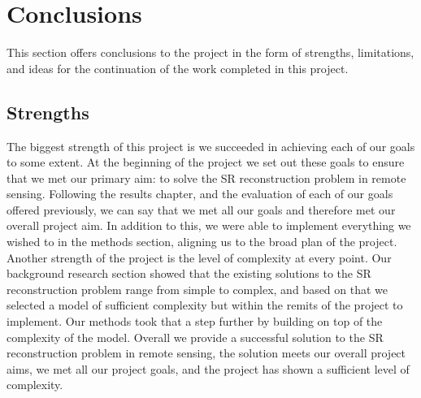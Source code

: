 \section{Conclusions}
This section offers conclusions to the project in the form of strengths, limitations, and ideas for the continuation of the work completed in this project.

\subsection{Strengths}
The biggest strength of this project is we succeeded in achieving each of our goals to some extent. At the beginning of the project we set out these goals to ensure that we met our primary aim: to solve the SR reconstruction problem in remote sensing. Following the results chapter, and the evaluation of each of our goals offered previously, we can say that we met all our goals and therefore met our overall project aim. In addition to this, we were able to implement everything we wished to in the methods section, aligning us to the broad plan of the project. Another strength of the project is the level of complexity at every point. Our background research section showed that the existing solutions to the SR reconstruction problem range from simple to complex, and based on that we selected a model of sufficient complexity but within the remits of the project to implement. Our methods took that a step further by building on top of the complexity of the model. Overall we provide a successful solution to the SR reconstruction problem in remote sensing, the solution meets our overall project aims, we met all our project goals, and the project has shown a sufficient level of complexity.

